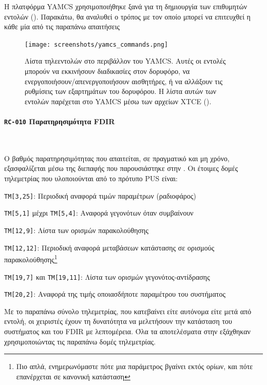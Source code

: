 \documentclass[a4paper,nobib]{tufte-book}
\begin{document}
Η πλατφόρμα \ac{YAMCS} χρησιμοποιήθηκε ξανά για τη δημιουργία των επιθυμητών εντολών (). Παρακάτω, θα αναλυθεί ο τρόπος με τον οποίο μπορεί να επιτευχθεί η κάθε μία από τις παραπάνω απαιτήσεις

\begin{figure}[h]
	\texttt{[image: screenshots/yamcs\_commands.png]}
	\caption[Λίστα τηλεεντολών στο περιβάλλον του \acs{YAMCS}]{Λίστα τηλεεντολών στο περιβάλλον του \acs{YAMCS}. Αυτές οι εντολές μπορούν να εκκινήσουν διαδικασίες στον δορυφόρο, να ενεργοποιήσουν/απενεργοποιήσουν αισθητήρες, ή να αλλάξουν τις ρυθμίσεις των εξαρτημάτων του δορυφόρου. Η λίστα αυτών των εντολών παρέχεται στο \acs{YAMCS} μέσω των αρχείων \ac{XTCE} ().}
	\label{fig:yamcs_commands}
\end{figure}

\paragraph{\textbf{\texttt{RC-010} Παρατηρησιμότητα \acs{FDIR}}}~

Ο βαθμός παρατηρησιμότητας που απαιτείται, σε πραγματικό και μη χρόνο, εξασφαλίζεται μέσω της διεπαφής που παρουσιάστηκε στην . Οι έτοιμες δομές τηλεμετρίας που υλοποιούνται από το πρότυπο \acs{PUS} \autocite{ECSS-E-ST-70-41C} είναι:
\begin{compactitem}
	\item \texttt{TM[3,25]}: Περιοδική αναφορά τιμών παραμέτρων (ραδιοφάρος)
	\item \texttt{TM[5,1]} μέχρι \texttt{TM[5,4]}: Αναφορά γεγονότων όταν συμβαίνουν
	\item \texttt{TM[12,9]}: Λίστα των ορισμών παρακολούθησης
	\item \texttt{TM[12,12]}: Περιοδική αναφορά μεταβάσεων κατάστασης σε ορισμούς παρακολούθησης\footnote{Πιο απλά, ενημερωνόμαστε πότε μια παράμετρος βγαίνει εκτός ορίων, και πότε επανέρχεται σε κανονική κατάσταση}
	\item \texttt{TM[19,7]} και \texttt{TM[19,11]}: Λίστα των ορισμών γεγονότος-αντίδρασης
	\item \texttt{TM[20,2]}: Αναφορά της τιμής οποιασδήποτε παραμέτρου του συστήματος
\end{compactitem}

Με το παραπάνω σύνολο τηλεμετρίας, που κατεβαίνει είτε αυτόνομα είτε μετά από εντολή, οι χειριστές έχουν τη δυνατότητα να μελετήσουν την κατάσταση του συστήματος και του \acs{FDIR} με λεπτομέρεια. Όλα τα αποτελέσματα στην  εξάχθηκαν χρησιμοποιώντας τις παραπάνω δομές τηλεμετρίας.
\end{document}
